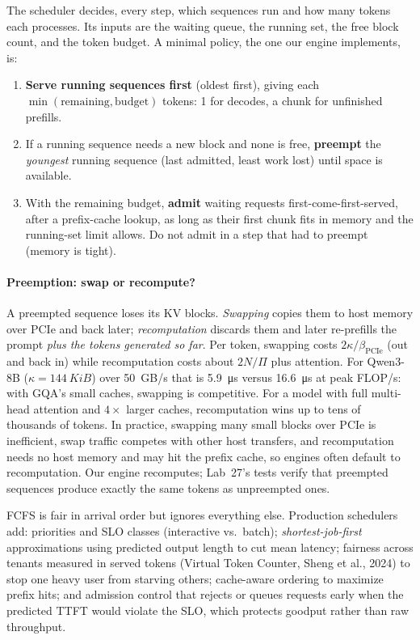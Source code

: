 The scheduler decides, every step, which sequences run and how many tokens each processes. Its inputs
are the waiting queue, the running set, the free block count, and the token budget. A minimal policy,
the one our engine implements, is:
\begin{enumerate}
  \item \textbf{Serve running sequences first} (oldest first), giving each $\min(\text{remaining},
    \text{budget})$ tokens: 1 for decodes, a chunk for unfinished prefills.
  \item If a running sequence needs a new block and none is free, \textbf{preempt} the \emph{youngest}
    running sequence (last admitted, least work lost) until space is available.
  \item With the remaining budget, \textbf{admit} waiting requests first-come-first-served, after a
    prefix-cache lookup, as long as their first chunk fits in memory and the running-set limit allows.
    Do not admit in a step that had to preempt (memory is tight).
\end{enumerate}

\paragraph{Preemption: swap or recompute?} A preempted sequence loses its KV blocks. \emph{Swapping}
copies them to host memory over PCIe and back later; \emph{recomputation} discards them and later
re-prefills the prompt \emph{plus the tokens generated so far}. Per token, swapping costs
$2\kappa/\beta_{\text{PCIe}}$ (out and back in) while recomputation costs about $2N/\Pi$ plus attention.
For Qwen3-8B ($\kappa=\SI{144}{KiB}$) over \SI{50}{GB/s} that is \SI{5.9}{\micro s} versus
\SI{16.6}{\micro s} at peak FLOP/s: with GQA's small caches, swapping is competitive. For a model with
full multi-head attention and $4\times$ larger caches, recomputation wins up to tens of thousands of
tokens. In practice, swapping many small blocks over PCIe is inefficient, swap traffic competes with
other host transfers, and recomputation needs no host memory and may hit the prefix cache, so engines
often default to recomputation. Our engine recomputes; Lab~27's tests verify that preempted sequences produce exactly the
same tokens as unpreempted ones.

\begin{systemslens}
FCFS is fair in arrival order but ignores everything else. Production schedulers add: priorities and
SLO classes (interactive vs.\ batch); \emph{shortest-job-first} approximations using predicted output
length to cut mean latency; fairness across tenants measured in served tokens (Virtual Token Counter,
Sheng et al., 2024) to stop one heavy user from starving others; cache-aware ordering to maximize
prefix hits; and admission control that rejects or queues requests early when the predicted TTFT would
violate the SLO, which protects goodput rather than raw throughput.
\end{systemslens}

